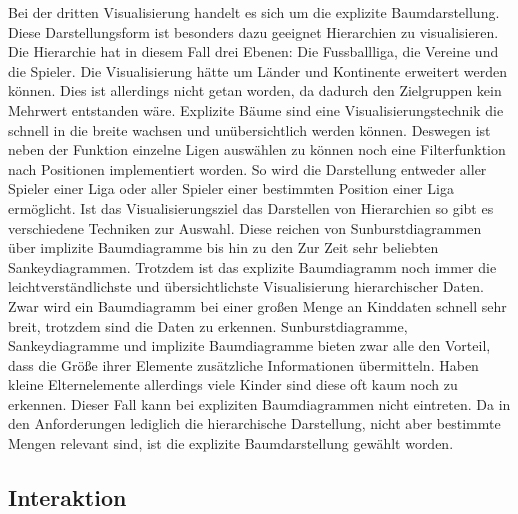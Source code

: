 \documentclass[usegeometry=true]{scrartcl}
\begin{document}
Bei der dritten Visualisierung handelt es sich um die explizite Baumdarstellung. Diese Darstellungsform ist besonders dazu geeignet Hierarchien zu visualisieren. 
Die Hierarchie hat in diesem Fall drei Ebenen: Die Fussballliga, die Vereine und die Spieler.
Die Visualisierung hätte um Länder und Kontinente erweitert werden können. Dies ist allerdings nicht getan worden, da dadurch den Zielgruppen kein Mehrwert entstanden wäre.
Explizite Bäume sind eine Visualisierungstechnik die schnell in die breite wachsen und unübersichtlich werden können. Deswegen ist neben der Funktion einzelne Ligen auswählen zu können noch eine Filterfunktion nach Positionen implementiert worden. So wird die Darstellung entweder aller Spieler einer Liga oder aller Spieler einer bestimmten Position einer Liga ermöglicht. Ist das Visualisierungsziel das Darstellen von Hierarchien so gibt es verschiedene Techniken zur Auswahl. Diese reichen von Sunburstdiagrammen über implizite Baumdiagramme bis hin zu den Zur Zeit sehr beliebten Sankeydiagrammen. Trotzdem ist das explizite Baumdiagramm noch immer die leichtverständlichste und übersichtlichste Visualisierung hierarchischer Daten. Zwar wird ein Baumdiagramm bei einer großen Menge an Kinddaten schnell sehr breit, trotzdem sind die Daten zu erkennen. Sunburstdiagramme, Sankeydiagramme und implizite Baumdiagramme bieten zwar alle den Vorteil, dass die Größe ihrer Elemente zusätzliche Informationen übermitteln. Haben kleine Elternelemente allerdings viele Kinder sind diese oft kaum noch zu erkennen. Dieser Fall kann bei expliziten Baumdiagrammen nicht eintreten. Da in den Anforderungen lediglich die hierarchische Darstellung, nicht aber bestimmte Mengen relevant sind, ist die explizite Baumdarstellung gewählt worden.

\subsection{Interaktion}

\end{document}

